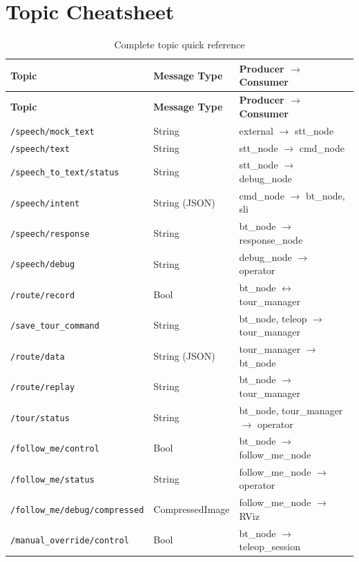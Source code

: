\documentclass[12pt,a4paper]{report}
\newcommand{\topic}[1]{\texttt{\color{purple!80!black}#1}}
\begin{document}
\section{Topic Cheatsheet}

\begin{longtable}{L{5cm} L{4cm} L{4.5cm}}
  \caption{Complete topic quick reference} \\
  \toprule
  \textbf{Topic} & \textbf{Message Type} & \textbf{Producer $\to$ Consumer} \\
  \midrule
  \endfirsthead
  \toprule
  \textbf{Topic} & \textbf{Message Type} & \textbf{Producer $\to$ Consumer} \\
  \midrule
  \endhead
  \bottomrule
  \endfoot
  \topic{/speech/mock\_text}         & String           & external $\to$ stt\_node \\
  \topic{/speech/text}               & String           & stt\_node $\to$ cmd\_node \\
  \topic{/speech\_to\_text/status}   & String           & stt\_node $\to$ debug\_node \\
  \topic{/speech/intent}             & String (JSON)    & cmd\_node $\to$ bt\_node, sli \\
  \topic{/speech/response}           & String           & bt\_node $\to$ response\_node \\
  \topic{/speech/debug}              & String           & debug\_node $\to$ operator \\
  \topic{/route/record}              & Bool             & bt\_node $\leftrightarrow$ tour\_manager \\
  \topic{/save\_tour\_command}       & String           & bt\_node, teleop $\to$ tour\_manager \\
  \topic{/route/data}                & String (JSON)    & tour\_manager $\to$ bt\_node \\
  \topic{/route/replay}              & String           & bt\_node $\to$ tour\_manager \\
  \topic{/tour/status}               & String           & bt\_node, tour\_manager $\to$ operator \\
  \topic{/follow\_me/control}        & Bool             & bt\_node $\to$ follow\_me\_node \\
  \topic{/follow\_me/status}         & String           & follow\_me\_node $\to$ operator \\
  \topic{/follow\_me/debug/compressed} & CompressedImage & follow\_me\_node $\to$ RViz \\
  \topic{/manual\_override/control}  & Bool             & bt\_node $\to$ teleop\_session \\

\end{longtable}
\end{document}
